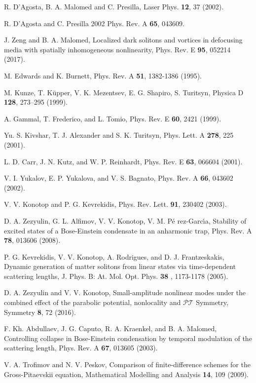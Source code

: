 \documentclass[aps,preprint,showkeys,
]{revtex4}
\begin{document}
\begin{thebibliography}{99}
 R. D'Agosta, B. A. Malomed and C. Presilla, Laser Phys.
\textbf{12}, 37 (2002).

 R. D'Agosta and C. Presilla 2002 Phys. Rev. A \textbf{65},
043609.

 J. Zeng and B. A. Malomed, Localized dark solitons and
vortices in defocusing media with spatially inhomogeneous nonlinearity,
Phys. Rev. E \textbf{95}, 052214 (2017).

 M. Edwards and K. Burnett,
Phys. Rev. A \textbf{51}, 1382-1386 (1995).

 M. Kunze, T. K\"upper, V. K. Mezentsev, E. G. Shapiro, S.
Turitsyn, %
Physica D \textbf{128}, 273--295 (1999).

 A. Gammal, T. Frederico, and L. Tomio,
Phys. Rev. E \textbf{60}, 2421 (1999).

 Yu. S. Kivshar, T. J. Alexander and S. K. Turitsyn, Phys.
Lett. A \textbf{278}, 225 (2001).

 L. D. Carr, J. N. Kutz, and W. P. Reinhardt, Phys. Rev. E
\textbf{63}, 066604 (2001).

 V. I. Yukalov, E. P. Yukalova, and V. S. Bagnato, Phys. Rev.
A \textbf{66}, 043602 (2002).

 V. V. Konotop and P. G. Kevrekidis,
Phys. Rev. Lett. \textbf{91}, 230402 (2003).

 D. A. Zezyulin, G. L. Alfimov, V. V. Konotop, V. M. P\'{e}%
rez-Garc\'{\i}a, Stability of excited states of a Bose-Einstein condensate
in an anharmonic trap, Phys. Rev. A \textbf{78}, 013606 (2008).

 P. G. Kevrekidis, V. V. Konotop, A. Rodrigues, and D. J.
Frantzeskakis, Dynamic generation of matter solitons from linear states via
time-dependent scattering lengths, J. Phys. B: At. Mol. Opt. Phys. \textbf{38%
}, 1173-1178 (2005).

 D. A. Zezyulin and V. V. Konotop, Small-amplitude nonlinear
modes under the combined effect of the parabolic potential, nonlocality and $%
\mathcal{PT}$ Symmetry, Symmetry \textbf{8}, 72 (2016).

 F. Kh. Abdullaev, J. G. Caputo, R. A. Kraenkel, and B.
A. Malomed, Controlling collapse in Bose-Einstein condensation by temporal
modulation of the scattering length, Phys. Rev. A \textbf{67}, 013605 (2003).

 V. A. Trofimov and N. V. Peskov, Comparison of
finite-difference schemes for the Gross-Pitaevskii equation, Mathematical
Modelling and Analysis \textbf{14}, 109 (2009).
\end{thebibliography}
\end{document}
